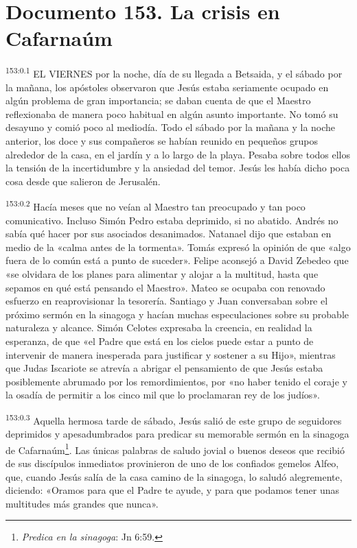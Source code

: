 \chapter{Documento 153. La crisis en Cafarnaúm}
\par
\textsuperscript{153:0.1} EL VIERNES por la noche, día de su llegada a Betsaida, y el sábado por la mañana, los apóstoles observaron que Jesús estaba seriamente ocupado en algún problema de gran importancia; se daban cuenta de que el Maestro reflexionaba de manera poco habitual en algún asunto importante. No tomó su desayuno y comió poco al mediodía. Todo el sábado por la mañana y la noche anterior, los doce y sus compañeros se habían reunido en pequeños grupos alrededor de la casa, en el jardín y a lo largo de la playa. Pesaba sobre todos ellos la tensión de la incertidumbre y la ansiedad del temor. Jesús les había dicho poca cosa desde que salieron de Jerusalén.

\par
\textsuperscript{153:0.2} Hacía meses que no veían al Maestro tan preocupado y tan poco comunicativo. Incluso Simón Pedro estaba deprimido, si no abatido. Andrés no sabía qué hacer por sus asociados desanimados. Natanael dijo que estaban en medio de la «calma antes de la tormenta». Tomás expresó la opinión de que «algo fuera de lo común está a punto de suceder». Felipe aconsejó a David Zebedeo que «se olvidara de los planes para alimentar y alojar a la multitud, hasta que sepamos en qué está pensando el Maestro». Mateo se ocupaba con renovado esfuerzo en reaprovisionar la tesorería. Santiago y Juan conversaban sobre el próximo sermón en la sinagoga y hacían muchas especulaciones sobre su probable naturaleza y alcance. Simón Celotes expresaba la creencia, en realidad la esperanza, de que «el Padre que está en los cielos puede estar a punto de intervenir de manera inesperada para justificar y sostener a su Hijo», mientras que Judas Iscariote se atrevía a abrigar el pensamiento de que Jesús estaba posiblemente abrumado por los remordimientos, por «no haber tenido el coraje y la osadía de permitir a los cinco mil que lo proclamaran rey de los judíos».

\par
\textsuperscript{153:0.3} Aquella hermosa tarde de sábado, Jesús salió de este grupo de seguidores deprimidos y apesadumbrados para predicar su memorable sermón en la sinagoga de Cafarnaúm\footnote{\textit{Predica en la sinagoga}: Jn 6:59.}. Las únicas palabras de saludo jovial o buenos deseos que recibió de sus discípulos inmediatos provinieron de uno de los confiados gemelos Alfeo, que, cuando Jesús salía de la casa camino de la sinagoga, lo saludó alegremente, diciendo: «Oramos para que el Padre te ayude, y para que podamos tener unas multitudes más grandes que nunca».

